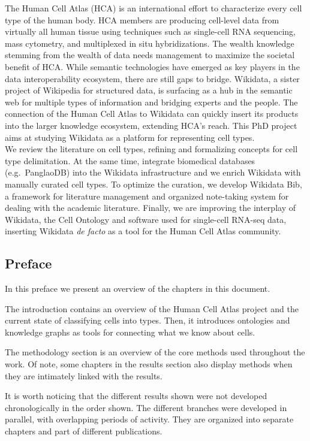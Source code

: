 The Human Cell Atlas (HCA) is an international effort to characterize every cell type of the human body.
HCA members are producing cell-level data from virtually all human tissue using techniques such as single-cell RNA sequencing, mass cytometry, and multiplexed in situ hybridizations.
The wealth knowledge stemming from the wealth of data needs management to maximize the societal benefit of HCA.
While semantic technologies have emerged as key players in the data interoperability ecosystem, there are still gaps to bridge.
Wikidata, a sister project of Wikipedia for structured data, is surfacing as a hub in the semantic web for multiple types of information and bridging experts and the people.
The connection of the Human Cell Atlas to Wikidata can quickly insert its products into the larger knowledge ecosystem, extending HCA's reach.
This PhD project aims at studying Wikidata as a platform for representing cell types.\\
We review the literature on cell types, refining and formalizing concepts for cell type delimitation.
At the same time, integrate biomedical databases (e.g.~PanglaoDB) into the Wikidata infrastructure and we enrich Wikidata with manually curated cell types.
To optimize the curation, we develop Wikidata Bib, a framework for literature management and organized note-taking system for dealing with the academic literature.
Finally, we are improving the interplay of Wikidata, the Cell Ontology and software used for single-cell RNA-seq data, inserting Wikidata \emph{de facto} as a tool for the Human Cell Atlas community.

\hypertarget{preface}{%
\subsection{Preface}\label{preface}}

In this preface we present an overview of the chapters in this document.

The introduction contains an overview of the Human Cell Atlas project and the current state of classifying cells into types.
Then, it introduces ontologies and knowledge graphs as tools for connecting what we know about cells.

The methodology section is an overview of the core methods used throughout the work.
Of note, some chapters in the results section also display methods when they are intimately linked with the results.

It is worth noticing that the different results shown were not developed chronologically in the order shown.
The different branches were developed in parallel, with overlapping periods of activity.
They are organized into separate chapters and part of different publications.

